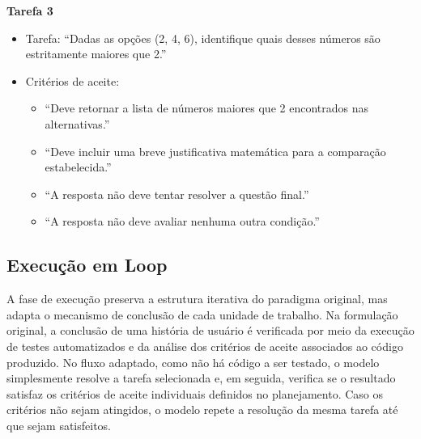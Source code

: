\documentclass[a4paper,10pt,twocolumn]{article}
\begin{document}
\begin{exemplo}
\textbf{Tarefa 3}
\begin{itemize}
    \item Tarefa: ``Dadas as opções (2, 4, 6), identifique quais desses números são estritamente maiores que 2.''
    \item Critérios de aceite:
    \begin{itemize}
        \item ``Deve retornar a lista de números maiores que 2 encontrados nas alternativas.''
        \item ``Deve incluir uma breve justificativa matemática para a comparação estabelecida.''
        \item ``A resposta não deve tentar resolver a questão final.''
        \item ``A resposta não deve avaliar nenhuma outra condição.''
    \end{itemize}
\end{itemize}
\end{exemplo}


\subsection{Execução em Loop}

A fase de execução preserva a estrutura iterativa do paradigma original, mas adapta o mecanismo de conclusão de cada unidade de trabalho. Na formulação original, a conclusão de uma história de usuário é verificada por meio da execução de testes automatizados e da análise dos critérios de aceite associados ao código produzido. No fluxo adaptado, como não há código a ser testado, o modelo simplesmente resolve a tarefa selecionada e, em seguida, verifica se o resultado satisfaz os critérios de aceite individuais definidos no planejamento. Caso os critérios não sejam atingidos, o modelo repete a resolução da mesma tarefa até que sejam satisfeitos.
\end{document}
